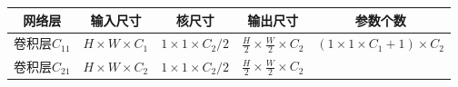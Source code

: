 \begin{longtable}[]{ ccccc }
\toprule
\begin{minipage}[b]{0.16\columnwidth}\centering\strut
网络层\strut
\end{minipage} & \begin{minipage}[b]{0.15\columnwidth}\centering\strut
输入尺寸\strut
\end{minipage} & \begin{minipage}[b]{0.17\columnwidth}\centering\strut
核尺寸\strut
\end{minipage} & \begin{minipage}[b]{0.16\columnwidth}\centering\strut
输出尺寸\strut
\end{minipage} & \begin{minipage}[b]{0.22\columnwidth}\centering\strut
参数个数\strut
\end{minipage}\tabularnewline
\midrule
\endhead
\begin{minipage}[t]{0.16\columnwidth}\centering\strut
卷积层\(C_{11}\)\strut
\end{minipage} & \begin{minipage}[t]{0.15\columnwidth}\centering\strut
\(H\times{W}\times{C_1}\)\strut
\end{minipage} & \begin{minipage}[t]{0.17\columnwidth}\centering\strut
\(1\times1\times{C_2}/2\)\strut
\end{minipage} & \begin{minipage}[t]{0.16\columnwidth}\centering\strut
\(\frac{H}{2}\times\frac{W}{2}\times{C_2}\)\strut
\end{minipage} & \begin{minipage}[t]{0.22\columnwidth}\centering\strut
\((1\times1\times{C_1}+1)\times{C_2}\)\strut
\end{minipage}\tabularnewline
\begin{minipage}[t]{0.16\columnwidth}\centering\strut
卷积层\(C_{21}\)\strut
\end{minipage} & \begin{minipage}[t]{0.15\columnwidth}\centering\strut
\(H\times{W}\times{C_2}\)\strut
\end{minipage} & \begin{minipage}[t]{0.17\columnwidth}\centering\strut
\(1\times1\times{C_2}/2\)\strut
\end{minipage} & \begin{minipage}[t]{0.16\columnwidth}\centering\strut
\(\frac{H}{2}\times\frac{W}{2}\times{C_2}\)\strut
\end{minipage} & \begin{minipage}[t]{0.22\columnwidth}\centering\strut

\end{minipage}
\end{longtable}
